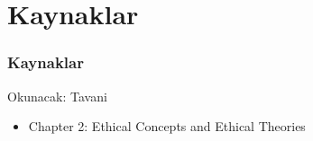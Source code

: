 \documentclass[dvipsnames]{beamer}
\theoremstyle{plain}
\begin{document}
\section*{Kaynaklar}

\begin{frame}
  \frametitle{Kaynaklar}

  \begin{block}{Okunacak: Tavani}
    \begin{itemize}
      \item Chapter 2: \alert{Ethical Concepts and Ethical Theories}
    \end{itemize}
  \end{block}
\end{frame}
\end{document}
